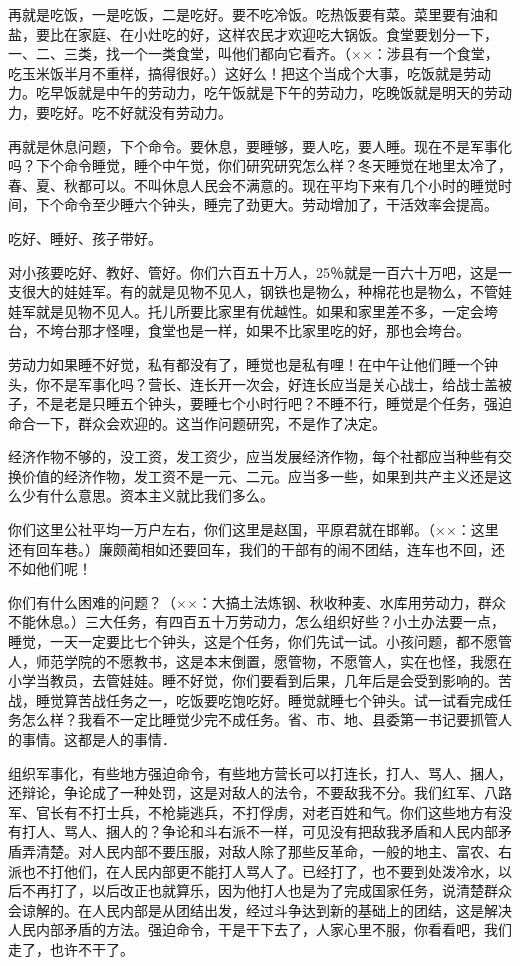再就是吃饭，一是吃饭，二是吃好。要不吃冷饭。吃热饭要有菜。菜里要有油和盐，要比在家庭、在小灶吃的好，这样农民才欢迎吃大锅饭。食堂要划分一下，一、二、三类，找一个一类食堂，叫他们都向它看齐。（××：涉县有一个食堂，吃玉米饭半月不重样，搞得很好。）这好么！把这个当成个大事，吃饭就是劳动力。吃早饭就是中午的劳动力，吃午饭就是下午的劳动力，吃晚饭就是明天的劳动力，要吃好。吃不好就没有劳动力。

再就是休息问题，下个命令。要休息，要睡够，要人吃，要人睡。现在不是军事化吗？下个命令睡觉，睡个中午觉，你们研究研究怎么样？冬天睡觉在地里太冷了，春、夏、秋都可以。不叫休息人民会不满意的。现在平均下来有几个小时的睡觉时间，下个命令至少睡六个钟头，睡完了劲更大。劳动增加了，干活效率会提高。

吃好、睡好、孩子带好。

对小孩要吃好、教好、管好。你们六百五十万人，25％就是一百六十万吧，这是一支很大的娃娃军。有的就是见物不见人，钢铁也是物么，种棉花也是物么，不管娃娃军就是见物不见人。托儿所要比家里有优越性。如果和家里差不多，一定会垮台，不垮台那才怪哩，食堂也是一样，如果不比家里吃的好，那也会垮台。

劳动力如果睡不好觉，私有都没有了，睡觉也是私有哩！在中午让他们睡一个钟头，你不是军事化吗？营长、连长开一次会，好连长应当是关心战士，给战士盖被子，不是老是只睡五个钟头，要睡七个小时行吧？不睡不行，睡觉是个任务，强迫命合一下，群众会欢迎的。这当作问题研究，不是作了决定。

经济作物不够的，没工资，发工资少，应当发展经济作物，每个社都应当种些有交换价值的经济作物，发工资不是一元、二元。应当多一些，如果到共产主义还是这么少有什么意思。资本主义就比我们多么。

你们这里公社平均一万户左右，你们这里是赵国，平原君就在邯郸。（××：这里还有回车巷。）廉颇蔺相如还要回车，我们的干部有的闹不团结，连车也不回，还不如他们呢！

你们有什么困难的问题？（××：大搞土法炼钢、秋收种麦、水库用劳动力，群众不能休息。）三大任务，有四百五十万劳动力，怎么组织好些？小土办法要一点，睡觉，一天一定要比七个钟头，这是个任务，你们先试一试。小孩问题，都不愿管人，师范学院的不愿教书，这是本末倒置，愿管物，不愿管人，实在也怪，我愿在小学当教员，去管娃娃。睡不好觉，你们要看到后果，几年后是会受到影响的。苦战，睡觉算苦战任务之一，吃饭要吃饱吃好。睡觉就睡七个钟头。试一试看完成任务怎么样？我看不一定比睡觉少完不成任务。省、市、地、县委第一书记要抓管人的事情。这都是人的事情．

组织军事化，有些地方强迫命令，有些地方营长可以打连长，打人、骂人、捆人，还辩论，争论成了一种处罚，这是对敌人的法令，不要敌我不分。我们红军、八路军、官长有不打士兵，不枪毙逃兵，不打俘虏，对老百姓和气。你们这些地方有没有打人、骂人、捆人的？争论和斗右派不一样，可见没有把敌我矛盾和人民内部矛盾弄清楚。对人民内部不要压服，对敌人除了那些反革命，一般的地主、富农、右派也不打他们，在人民内部更不能打人骂人了。已经打了，也不要到处泼冷水，以后不再打了，以后改正也就算乐，因为他打人也是为了完成国家任务，说清楚群众会谅解的。在人民内部是从团结出发，经过斗争达到新的基础上的团结，这是解决人民内部矛盾的方法。强迫命令，干是干下去了，人家心里不服，你看看吧，我们走了，也许不干了。


